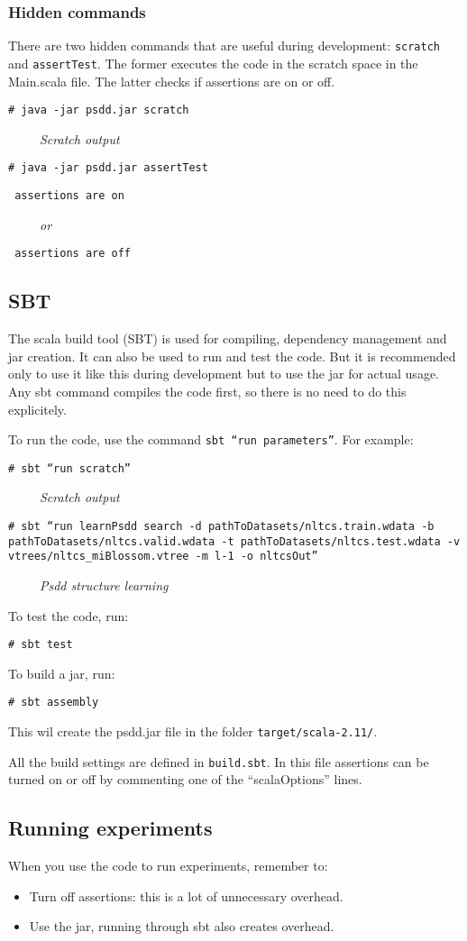 \documentclass[a4paper,10pt]{article}
\newcommand{\cl}[1]{\begin{framed} #1 \end{framed}}
\newcommand{\code}[1]{\tt\# #1}
\newcommand{\out}[1]{\texttt{ #1}}
\newcommand{\comment}[1]{~~~~~\emph{#1}}
\begin{document}
\subsubsection{Hidden commands}
There are two hidden commands that are useful during development: {\tt scratch} and {\tt assertTest}. The former executes the code in the scratch space in the Main.scala file. The latter checks if assertions are on or off.

\cl{
\code{java -jar psdd.jar scratch}

\comment{Scratch output}

\code{java -jar psdd.jar assertTest}

\out{assertions are on}

\comment{or}

\out{assertions are off}
}


\subsection{SBT}

The scala build tool (SBT) is used for compiling, dependency management and jar creation. It can also be used to run and test the code. But it is recommended only to use it like this during development but to use the jar for actual usage. Any sbt command compiles the code first, so there is no need to do this explicitely.

To run the code, use the command {\tt sbt ``run \emph{parameters}''}. For example:

\cl{

\code{sbt ``run scratch''}

\comment {Scratch output}

\code{sbt ``run learnPsdd search -d pathToDatasets/nltcs.train.wdata -b pathToDatasets/nltcs.valid.wdata -t pathToDatasets/nltcs.test.wdata -v vtrees/nltcs\_miBlossom.vtree -m l-1 -o nltcsOut''}

\comment{Psdd structure learning}
}


To test the code, run:
\cl{
\code{sbt test}
}

To build a jar, run:
\cl{
\code{sbt assembly}
}
This wil create the psdd.jar file in the folder {\tt target/scala-2.11/}.

All the build settings are defined in {\tt build.sbt}. In this file assertions can be turned on or off by commenting one of the ``scalaOptions'' lines.

\subsection{Running experiments}
When you use the code to run experiments, remember to:
\begin{itemize}
 \item Turn off assertions: this is a lot of unnecessary overhead.
 \item Use the jar, running through sbt also creates overhead.
\end{itemize}
\end{document}
